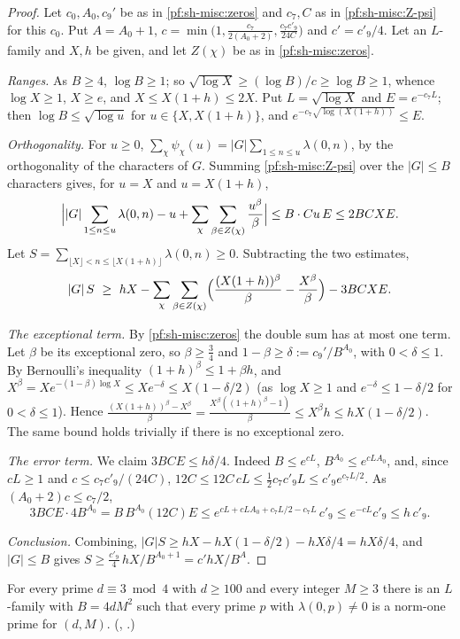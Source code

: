 \begin{proof}
Let $c_0,A_0,c_9'$ be as in \cref{pf:sh-misc:zeros} and $c_7,C$ as in \ref{pf:sh-misc:Z-psi} for this $c_0$. Put $A=A_0+1$,
$c=\min\bigl(1,\frac{c_7}{2(A_0+2)},\frac{c_7c'_9}{24C}\bigr)$ and $c'=c'_9/4$. Let an $L$-family and $X,h$ be given, and let $Z(\chi)$ be as in
\cref{pf:sh-misc:zeros}.

\emph{Ranges.} As $B\ge4$, $\log B\ge1$; so $\sqrt{\log X}\ge(\log B)/c\ge\log B\ge1$, whence $\log X\ge1$, $X\ge e$, and
$X\le X(1+h)\le2X$. Put $L=\sqrt{\log X}$ and $E=e^{-c_7L}$; then $\log B\le\sqrt{\log u}$ for $u\in\{X,X(1+h)\}$, and
$e^{-c_7\sqrt{\log(X(1+h))}}\le E$.

\emph{Orthogonality.} For $u\ge0$, $\sum_\chi\psi_\chi(u)=|G|\sum_{1\le n\le u}\lambda(0,n)$, by the orthogonality of the characters of $G$. Summing
\ref{pf:sh-misc:Z-psi} over the $|G|\le B$ characters gives, for $u=X$ and $u=X(1+h)$,
\[
\Bigl||G|\sum_{1\le n\le u}\lambda(0,n)-u+\sum_\chi\sum_{\beta\in Z(\chi)}\frac{u^\beta}\beta\Bigr|\le B\cdot Cu\,E\le2BCXE .
\]
Let $S=\sum_{\lfloor X\rfloor<n\le\lfloor X(1+h)\rfloor}\lambda(0,n)\ge0$. Subtracting the two estimates,
\[
|G|\,S\ \ge\ hX-\sum_\chi\sum_{\beta\in Z(\chi)}\Bigl(\frac{(X(1+h))^\beta}\beta-\frac{X^\beta}\beta\Bigr)-3BCXE .
\]

\emph{The exceptional term.} By \cref{pf:sh-misc:zeros} the double sum has at most one term. Let $\beta$ be its exceptional zero, so $\beta\ge\frac34$
and $1-\beta\ge\delta:=c_9'/B^{A_0}$, with $0<\delta\le1$. By Bernoulli's inequality $(1+h)^\beta\le1+\beta h$, and
$X^\beta=Xe^{-(1-\beta)\log X}\le Xe^{-\delta}\le X(1-\delta/2)$ (as $\log X\ge1$ and $e^{-\delta}\le1-\delta/2$ for $0<\delta\le1$). Hence
$\frac{(X(1+h))^\beta-X^\beta}\beta=\frac{X^\beta((1+h)^\beta-1)}\beta\le X^\beta h\le hX(1-\delta/2)$. The same bound holds trivially if there is no
exceptional zero.

\emph{The error term.} We claim $3BCE\le h\delta/4$. Indeed $B\le e^{cL}$, $B^{A_0}\le e^{cLA_0}$, and, since $cL\ge1$ and $c\le c_7c'_9/(24C)$,
$12C\le12C\,cL\le\frac12c_7c'_9L\le c'_9e^{c_7L/2}$. As
$(A_0+2)c\le c_7/2$,
\[
3BCE\cdot4B^{A_0}=B\,B^{A_0}(12C)E\le e^{cL+cLA_0+c_7L/2-c_7L}\,c'_9\le e^{-cL}c'_9\le h\,c'_9 .
\]

\emph{Conclusion.} Combining, $|G|S\ge hX-hX(1-\delta/2)-hX\delta/4=hX\delta/4$, and $|G|\le B$ gives
$S\ge\frac{c'_9}4\,hX/B^{A_0+1}=c'hX/B^A$.
\end{proof}

\begin{theorem}\label{pf:sh-misc:lfamray}
For every prime $d\equiv3\bmod4$ with $d\ge100$ and every integer $M\ge3$ there is an $L$-family with $B=4dM^2$ such that every prime $p$ with
$\lambda(0,p)\ne0$ is a norm-one prime for $(d,M)$. \textup{(},
.\textup{)}
\end{theorem}

